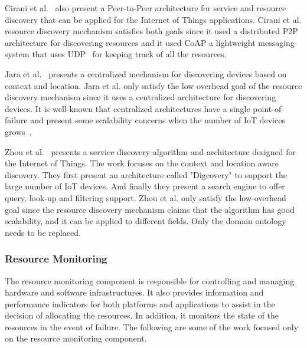 Cirani et al.~\cite{6899579} also present a Peer-to-Peer architecture for service and resource discovery that can be applied for the Internet of Things applications. Cirani et al. resource discovery mechanism satisfies both goals since it used a distributed P2P architecture for discovering resources and it used CoAP a lightweight messaging system that uses UDP~\cite{8088251} for keeping track of all the resources.


Jara et al.~\cite{6550579} presents a centralized mechanism for discovering devices based on context and location. Jara et al. only satisfy the low overhead goal of the resource discovery mechanism since it uses a centralized architecture for discovering devices. It is well-known that centralized architectures have a single point-of-failure and present some scalability concerns when the number of IoT devices grows~\cite{6680268}. 


Zhou et al.~\cite{6664533} presents a service discovery algorithm and architecture designed for the Internet of Things. The work focuses on the context and location aware discovery. They first present an architecture called "Digcovery" to support the large number of IoT devices. And finally they present a search engine to offer query, look-up and filtering support. Zhou et al. only satisfy the low-overhead goal since the resource discovery mechanism claims that the algorithm has good scalability, and it can be applied to different fields. Only the domain ontology needs to be replaced.

\subsubsection{Resource Monitoring}
The resource monitoring component is responsible for controlling and managing hardware and software infrastructures. It also provides information and performance indicators for both platforms and applications to assist in the decision of allocating the resources. In addition, it monitors the state of the resources in the event of failure. The following are some of the work focused only on the resource monitoring component.

